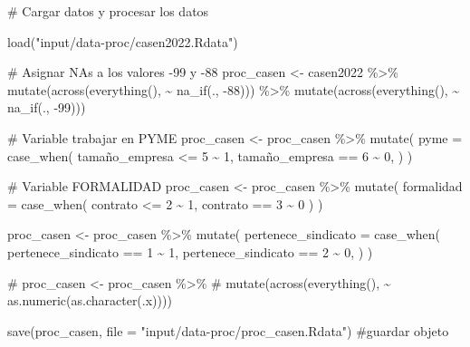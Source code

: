 \documentclass[
  a4paper,
  oneside]{scrbook}
\newenvironment{Shaded}{\begin{snugshade}}{\end{snugshade}}
\newcommand{\AttributeTok}[1]{\textcolor[rgb]{0.40,0.45,0.13}{#1}}
\newcommand{\CommentTok}[1]{\textcolor[rgb]{0.37,0.37,0.37}{#1}}
\newcommand{\DecValTok}[1]{\textcolor[rgb]{0.68,0.00,0.00}{#1}}
\newcommand{\FunctionTok}[1]{\textcolor[rgb]{0.28,0.35,0.67}{#1}}
\newcommand{\NormalTok}[1]{\textcolor[rgb]{0.00,0.23,0.31}{#1}}
\newcommand{\OtherTok}[1]{\textcolor[rgb]{0.00,0.23,0.31}{#1}}
\newcommand{\SpecialCharTok}[1]{\textcolor[rgb]{0.37,0.37,0.37}{#1}}
\newcommand{\StringTok}[1]{\textcolor[rgb]{0.13,0.47,0.30}{#1}}
\begin{document}
\begin{Shaded}
\begin{Highlighting}[]
\CommentTok{\# Cargar datos y procesar los datos}

\FunctionTok{load}\NormalTok{(}\StringTok{"input/data{-}proc/casen2022.Rdata"}\NormalTok{)}

\CommentTok{\# Asignar NAs a los valores {-}99 y {-}88}
\NormalTok{proc\_casen }\OtherTok{\textless{}{-}}\NormalTok{ casen2022 }\SpecialCharTok{\%\textgreater{}\%}
  \FunctionTok{mutate}\NormalTok{(}\FunctionTok{across}\NormalTok{(}\FunctionTok{everything}\NormalTok{(), }\SpecialCharTok{\textasciitilde{}} \FunctionTok{na\_if}\NormalTok{(., }\SpecialCharTok{{-}}\DecValTok{88}\NormalTok{))) }\SpecialCharTok{\%\textgreater{}\%}  
  \FunctionTok{mutate}\NormalTok{(}\FunctionTok{across}\NormalTok{(}\FunctionTok{everything}\NormalTok{(), }\SpecialCharTok{\textasciitilde{}} \FunctionTok{na\_if}\NormalTok{(., }\SpecialCharTok{{-}}\DecValTok{99}\NormalTok{)))}

\CommentTok{\# Variable trabajar en PYME}
\NormalTok{proc\_casen }\OtherTok{\textless{}{-}}\NormalTok{ proc\_casen }\SpecialCharTok{\%\textgreater{}\%} \FunctionTok{mutate}\NormalTok{(}
  \AttributeTok{pyme =} \FunctionTok{case\_when}\NormalTok{(}
\NormalTok{    tamaño\_empresa }\SpecialCharTok{\textless{}=} \DecValTok{5} \SpecialCharTok{\textasciitilde{}} \DecValTok{1}\NormalTok{,}
\NormalTok{    tamaño\_empresa }\SpecialCharTok{==} \DecValTok{6} \SpecialCharTok{\textasciitilde{}} \DecValTok{0}\NormalTok{,}
\NormalTok{  )}
\NormalTok{)}

\CommentTok{\# Variable FORMALIDAD}
\NormalTok{proc\_casen }\OtherTok{\textless{}{-}}\NormalTok{ proc\_casen }\SpecialCharTok{\%\textgreater{}\%} \FunctionTok{mutate}\NormalTok{(}
  \AttributeTok{formalidad =} \FunctionTok{case\_when}\NormalTok{(}
\NormalTok{    contrato }\SpecialCharTok{\textless{}=} \DecValTok{2} \SpecialCharTok{\textasciitilde{}} \DecValTok{1}\NormalTok{,}
\NormalTok{    contrato }\SpecialCharTok{==} \DecValTok{3} \SpecialCharTok{\textasciitilde{}} \DecValTok{0}
\NormalTok{  )}
\NormalTok{)}

\NormalTok{proc\_casen }\OtherTok{\textless{}{-}}\NormalTok{ proc\_casen }\SpecialCharTok{\%\textgreater{}\%} \FunctionTok{mutate}\NormalTok{(}
  \AttributeTok{pertenece\_sindicato =} \FunctionTok{case\_when}\NormalTok{(}
\NormalTok{    pertenece\_sindicato }\SpecialCharTok{==} \DecValTok{1} \SpecialCharTok{\textasciitilde{}} \DecValTok{1}\NormalTok{,}
\NormalTok{    pertenece\_sindicato }\SpecialCharTok{==} \DecValTok{2} \SpecialCharTok{\textasciitilde{}} \DecValTok{0}\NormalTok{,}
\NormalTok{  )}
\NormalTok{)}

\CommentTok{\# proc\_casen \textless{}{-} proc\_casen \%\textgreater{}\%}
\CommentTok{\#   mutate(across(everything(), \textasciitilde{} as.numeric(as.character(.x))))}

\FunctionTok{save}\NormalTok{(proc\_casen,}
     \AttributeTok{file =} \StringTok{"input/data{-}proc/proc\_casen.Rdata"}\NormalTok{) }\CommentTok{\#guardar objeto}
\end{Highlighting}
\end{Shaded}
\end{document}
